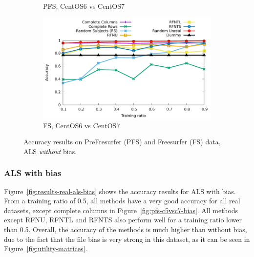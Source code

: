 \documentclass[10pt, conference, compsocconf]{IEEEtran}
\begin{document}
\begin{figure}
\begin{subfigure}[b]{\columnwidth}
        \caption{PFS, CentOS6 vs CentOS7}
\end{subfigure}\hfill
\begin{subfigure}[b]{\columnwidth}
        \includegraphics[width=0.8\columnwidth]{data/results/means_of_results/ALS/FS-100files/ALS-FS100files.pdf}
        \caption{FS, CentOS6 vs CentOS7}
\end{subfigure}
\caption{Accuracy results on PreFresurfer (PFS) and Freesurfer (FS) data, ALS \emph{without} bias.}
\label{fig:results-real-als}
\end{figure}

\subsubsection{ALS with bias}

Figure~\ref{fig:results-real-als-bias} shows the accuracy results for 
ALS with bias. From a training ratio of 0.5, all methods have a very 
good accuracy for all real datasets, except complete columns in 
Figure~\ref{fig:pfs-c5vsc7-bias}. All methods except RFNU, RFNTL and 
RFNTS also perform well for a training ratio lower than 0.5. Overall, 
the accuracy of the methods is much higher than without bias, due to 
the fact that the file bias is very strong in this dataset, as 
it can be seen in Figure~\ref{fig:utility-matrices}.
\end{document}
